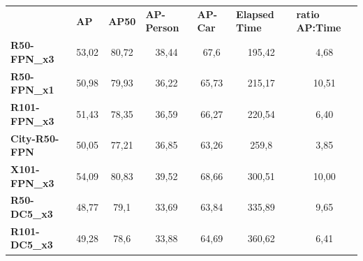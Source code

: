 \documentclass[11pt,a4paper,twocolumn,twoside]{article}
\begin{document}
\begin{table}[hbt]
\centering
\begin{tabularx}{\textwidth}{lcccccc}
\cline{1-7}
                                            & \multicolumn{1}{l}{\textbf{AP}} & \multicolumn{1}{l}{\textbf{AP50}} & \multicolumn{1}{l}{\textbf{AP-Person}} & \multicolumn{1}{l}{\textbf{AP-Car}} & \multicolumn{1}{l}{\textbf{Elapsed Time}} & \multicolumn{1}{l}{\textbf{ratio AP:Time}} \\ \cline{1-7}
\multicolumn{1}{|l|}{\textbf{R50-FPN\_x3}}  & \multicolumn{1}{c|}{53,02}      & \multicolumn{1}{c|}{80,72}        & \multicolumn{1}{c|}{38,44}             & 67,6                                & 195,42                                    & 4,68                                       \\ \cline{1-7}
\multicolumn{1}{|l|}{\textbf{R50-FPN\_x1}}  & \multicolumn{1}{c|}{50,98}      & \multicolumn{1}{c|}{79,93}        & \multicolumn{1}{c|}{36,22}             & 65,73                               & 215,17                                    & 10,51                                      \\ \cline{1-7}
\multicolumn{1}{|l|}{\textbf{R101-FPN\_x3}} & \multicolumn{1}{c|}{51,43}      & \multicolumn{1}{c|}{78,35}        & \multicolumn{1}{c|}{36,59}             & 66,27                               & 220,54                                    & 6,40                                       \\ \cline{1-7}
\multicolumn{1}{|l|}{\textbf{City-R50-FPN}} & \multicolumn{1}{c|}{50,05}      & \multicolumn{1}{c|}{77,21}        & \multicolumn{1}{c|}{36,85}             & 63,26                               & 259,8                                     & 3,85                                       \\ \cline{1-7}
\multicolumn{1}{|l|}{\textbf{X101-FPN\_x3}} & \multicolumn{1}{c|}{54,09}      & \multicolumn{1}{c|}{80,83}        & \multicolumn{1}{c|}{39,52}             & 68,66                               & 300,51                                    & 10,00                                      \\ \cline{1-7}
\multicolumn{1}{|l|}{\textbf{R50-DC5\_x3}}  & \multicolumn{1}{c|}{48,77}      & \multicolumn{1}{c|}{79,1}         & \multicolumn{1}{c|}{33,69}             & 63,84                               & 335,89                                    & 9,65                                       \\ \cline{1-7}
\multicolumn{1}{|l|}{\textbf{R101-DC5\_x3}} & \multicolumn{1}{c|}{49,28}      & \multicolumn{1}{c|}{78,6}         & \multicolumn{1}{c|}{33,88}             & 64,69                               & 360,62                                    & 6,41                                       \\ \cline{1-7}

\end{tabularx}
\end{table}
\end{document}
